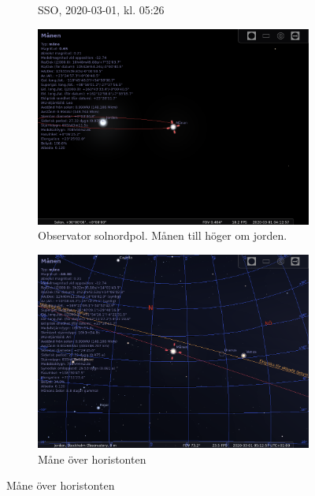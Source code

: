 \documentclass[./exercises.tex]{subfiles}
\begin{document}
\begin{itemize}
\begin{figure}[H]
\begin{subfigure}[b]{0.45\textwidth}
         \caption{SSO, 2020-03-01, kl. 05:26}
         \label{fig:y equals x}
     \end{subfigure}
     \hfill
     \begin{subfigure}[b]{0.45\textwidth}
         \centering
         \includegraphics[width=\textwidth]{Stellarium1/WaningCrescent/stellarium-001.png}
         \caption{Observator solnordpol. Månen till höger om jorden.}
         \label{fig:three sin x}
     \end{subfigure}
     \hfill
     \begin{subfigure}[b]{0.45\textwidth}
         \centering
         \includegraphics[width=\textwidth]{Stellarium1/WaningCrescent/stellarium-002.png}
         \caption{Måne över horistonten}
         \label{fig:three sin x}
     \end{subfigure}

\end{figure}
\end{itemize}
\end{document}
